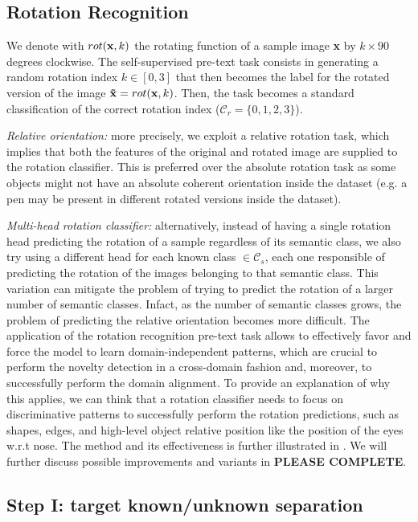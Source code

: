 \documentclass[10pt,twocolumn,letterpaper]{article}
\begin{document}
\subsection{Rotation Recognition}
\label{sec:rotrecognition}

We denote with $rot({\bf x}, k)$ the rotating function of a sample image {\bf x} by $k\times 90$ degrees clockwise.
The self-supervised pre-text task consists in generating a random rotation index $k \in [0, 3]$ that then becomes
the label for the rotated version of the image ${\bf \tilde{x}} = rot({\bf x}, k)$.
Then, the task becomes a standard classification of the correct rotation index ($\mathcal{C}_r = \{0, 1, 2, 3\}$).

{\it Relative orientation:}
more precisely, we exploit a relative rotation task,
which implies that both the features of the original and rotated image are supplied to the rotation classifier.
This is preferred over the absolute rotation task as some objects might not have an absolute coherent orientation
inside the dataset
(e.g. a pen may be present in different rotated versions inside the dataset). 

{\it Multi-head rotation classifier:}
alternatively, 
instead of having a single rotation head predicting the rotation of a sample regardless of its semantic class, 
we also try using a different head for each known class $\in \mathcal{C}_s$, each one responsible of predicting the rotation
of the images belonging to that semantic class.
This variation can mitigate the problem of trying to predict the rotation of a larger number
of semantic classes. Infact, as the number of semantic classes grows,
the problem of predicting the relative orientation becomes more difficult.
The application of the rotation recognition pre-text task allows to effectively favor and force the model to learn
domain-independent patterns, which are crucial to perform the novelty detection in a cross-domain fashion and, moreover,
to successfully perform the domain alignment.
To provide an explanation of why this applies, we can think that a rotation classifier needs to focus on discriminative patterns to
successfully perform the rotation predictions, such as shapes, edges, and high-level object relative position like the position of the eyes
w.r.t nose.
The method and its effectiveness is further illustrated in \cite{OldROS}. 
We will further discuss possible improvements and variants in {\bf PLEASE COMPLETE}.

\subsection{Step I: target known/unknown separation}
\label{sec:stepone}
\end{document}
